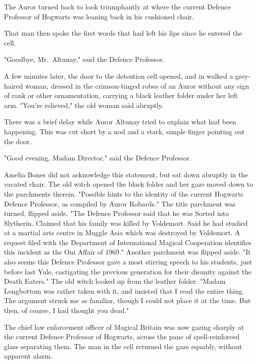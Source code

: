 The Auror turned back to look triumphantly at where the current Defence
Professor of Hogwarts was leaning back in his cushioned chair.

That man then spoke the first words that had left his lips since he entered the
cell.

"Goodbye, Mr.~Altunay," said the Defence Professor.

A few minutes later, the door to the detention cell opened, and in walked a
grey-haired woman, dressed in the crimson-tinged robes of an Auror without any
sign of rank or other ornamentation, carrying a black leather folder under her
left arm. "You're relieved," the old woman said abruptly.

There was a brief delay while Auror Altunay tried to explain what had been
happening. This was cut short by a nod and a stark, simple finger pointing out
the door.

"Good evening, Madam Director," said the Defence Professor.

Amelia Bones did not acknowledge this statement, but sat down abruptly in the
vacated chair. The old witch opened the black folder and her gaze moved down to
the parchments therein. "Possible hints to the identity of the current Hogwarts
Defence Professor, as compiled by Auror Robards." The title parchment was
turned, flipped aside. "The Defence Professor said that he was Sorted into
Slytherin. Claimed that his family was killed by Voldemort. Said he had studied
at a martial arts centre in Muggle Asia which was destroyed by Voldemort. A
request filed with the Department of International Magical Cooperation
identifies this incident as the Oni Affair of 1969." Another parchment was
flipped aside. "It also seems this Defence Professor gave a most stirring
speech to his students, just before last Yule, castigating the previous
generation for their disunity against the Death Eaters." The old witch looked
up from the leather folder. "Madam Longbottom was rather taken with it, and
insisted that I read the entire thing. The argument struck me as familiar,
though I could not place it at the time. But then, of course, I had thought you
dead."

The chief law enforcement officer of Magical Britain was now gazing sharply at
the current Defence Professor of Hogwarts, across the pane of spell-reinforced
glass separating them. The man in the cell returned the gaze equably, without
apparent alarm.

